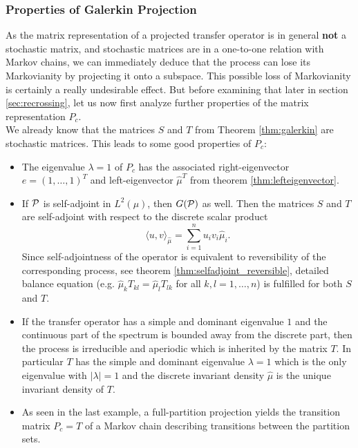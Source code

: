 \subsubsection*{Properties of Galerkin Projection} 

As the matrix representation of a projected transfer operator is in general \textbf{not} a stochastic matrix, and stochastic matrices are in a one-to-one relation with Markov chains,
we can immediately deduce that the process can lose its Markovianity by projecting it onto a subspace.
This possible loss of Markovianity is certainly a really undesirable effect. But before examining that later in section \ref{sec:recrossing}, let us now first analyze further properties of the matrix representation $P_c$.
\\

We already know that the matrices $S$ and $T$ from Theorem \ref{thm:galerkin} are stochastic matrices. This leads to some good properties of $P_c$:

\begin{itemize}
\item The eigenvalue $\lambda = 1$ of $P_c$ has the associated right-eigenvector $e = (1,\dots,1)^T$ and left-eigenvector $\hat{\mu}^T$ from theorem \ref{thm:lefteigenvector}.
\item If $\mathcal{P}$ is self-adjoint in $L^2(\mu)$, then $G(\mathcal{P})$ as well. Then the matrices $S$ and $T$ are self-adjoint with respect to the discrete scalar product 
\begin{equation*}
\langle u, v \rangle_{\hat{\mu}} = \sum_{i=1}^n u_i v_i \hat{\mu}_i.
\end{equation*}
Since self-adjointness of the operator is equivalent to reversibility of the corresponding process, see theorem \ref{thm:selfadjoint_reversible}, detailed balance equation (e.g. $\hat{\mu}_k T_{kl} = \hat{\mu}_l T_{lk}$ for all $k,l =1,\dots, n$) is fulfilled for both $S$ and $T$.
\item If the transfer operator has a simple and dominant eigenvalue $1$ and the continuous part of the spectrum is bounded away from the discrete part, then the process is irreducible and aperiodic which is inherited by the matrix $T$. In particular $T$ has the simple and dominant eigenvalue $\lambda=1$ which is the only eigenvalue with $|\lambda|=1$ and the discrete invariant density $\hat{\mu}$ is the unique invariant density of $T$.
\item As seen in the last example, a full-partition projection yields the transition matrix $P_c=T$ of a Markov chain describing transitions between the partition sets.
\end{itemize}

